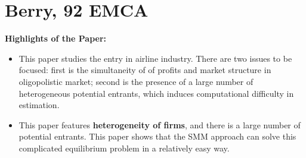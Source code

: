 \documentclass{book}
\theoremstyle{plain}
\theoremstyle{definition}
\begin{document}
\section{Berry, 92 EMCA} %
\label{sec:berry_92_emca}

\textbf{}

\vspace{1em}
\noindent
\textbf{Highlights of the Paper:}
\begin{itemize}
	\item This paper studies the entry in airline industry. There are two issues to be focused: first is the simultaneity of of profits and market structure in oligopolistic market; second is the presence of a large number of heterogeneous potential entrants, which induces computational difficulty in estimation.

	\item This paper features \textbf{heterogeneity of firms}, and there is a large number of potential entrants.
	This paper shows that the SMM approach can solve this complicated equilibrium problem in a relatively easy way.
\end{itemize}
\end{document}
